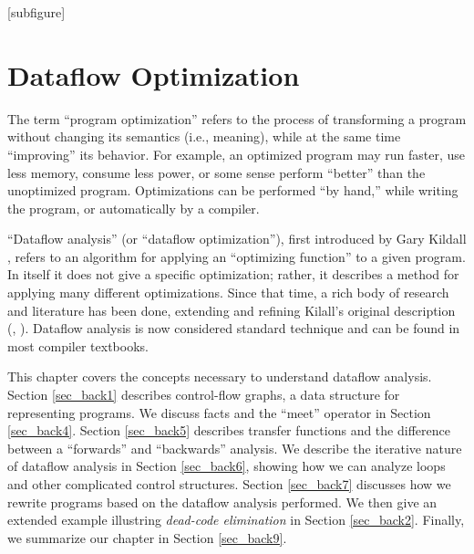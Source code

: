 \documentclass[12pt]{report}
\begin{document}

[subfigure]
\renewcommand{\textfraction}{0.1}
\renewcommand{\topfraction}{0.9}

\chapter{Dataflow Optimization}
\label{ref_chapter_background}



The term ``program optimization'' refers to the process of
transforming a program without changing its semantics (i.e., meaning),
while at the same time ``improving'' its behavior.  For example, an
optimized program may run faster, use less memory, consume less power,
or some sense perform ``better'' than the unoptimized
program. Optimizations can be performed ``by hand,'' while writing
the program, or automatically by a compiler. 

``Dataflow analysis'' (or ``dataflow optimization''), first introduced
by Gary Kildall \citep{Kildall1973}, refers to an algorithm for
applying an ``optimizing function'' to a given program. In itself it
does not give a specific optimization; rather, it describes a method
for applying many different optimizations. Since that time, a rich
body of research and literature has been done, extending and refining
Kilall's original description (\cite{SomePaperXX},
\cite{SomeBookXX}). Dataflow analysis is now considered standard
technique and can be found in most compiler textbooks.

This chapter covers the concepts necessary to understand dataflow
analysis. Section \ref{sec_back1} describes control-flow graphs, a
data structure for representing programs. We discuss facts and the
``meet'' operator in Section \ref{sec_back4}.  Section \ref{sec_back5}
describes transfer functions and the difference between a ``forwards''
and ``backwards'' analysis. We describe the iterative nature of
dataflow analysis in Section \ref{sec_back6}, showing how we can
analyze loops and other complicated control structures. Section
\ref{sec_back7} discusses how we rewrite programs based on the
dataflow analysis performed. We then give an extended example
illustring \emph{dead-code elimination} in Section
\ref{sec_back2}. Finally, we summarize our chapter in Section
\ref{sec_back9}.
\end{document}
